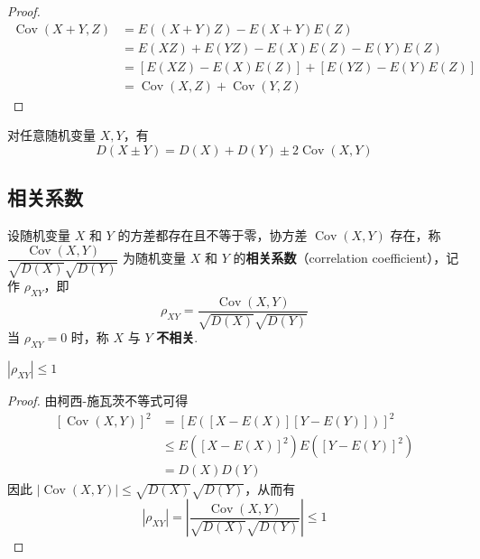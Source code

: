 \begin{proof}
    $$
    \begin{aligned}
        \operatorname{Cov}(X+Y,Z) &= E((X+Y)Z) - E(X+Y) E(Z) \\
        &= E(XZ) + E(YZ) - E(X) E(Z) - E(Y) E(Z) \\
        &= [E(XZ) - E(X) E(Z)] + [E(YZ) - E(Y) E(Z)] \\
        &= \operatorname{Cov}(X,Z) + \operatorname{Cov}(Y,Z)
    \end{aligned}
    $$
\end{proof}

\begin{property}
    对任意随机变量 $X,Y$，有
    $$
    D(X \pm Y) = D(X) + D(Y) \pm 2 \operatorname{Cov}(X,Y)
    $$
\end{property}

\subsection{相关系数}

\begin{definition}
    设随机变量 $X$ 和 $Y$ 的方差都存在且不等于零，协方差 $\operatorname{Cov}(X,Y)$ 存在，称 $\dfrac{\operatorname{Cov}(X,Y)}{\sqrt{D(X)} \sqrt{D(Y)}}$ 为随机变量 $X$ 和 $Y$ 的\textbf{相关系数}（correlation coefficient），记作 $\rho_{XY}$，即
    $$
    \rho_{XY} = \dfrac{\operatorname{Cov}(X,Y)}{\sqrt{D(X)} \sqrt{D(Y)}}
    $$
    当 $\rho_{XY} = 0$ 时，称 $X$ 与 $Y$ \textbf{不相关}.
\end{definition}

\begin{property}
    $|\rho_{XY}| \leqslant 1$
\end{property}

\vspace{-1.5em}

\begin{proof}
    由柯西-施瓦茨不等式可得
    $$
    \begin{aligned}
        \left[ \operatorname{Cov}(X,Y) \right]^2 &= [E([X-E(X)][Y-E(Y)])]^2 \\
        & \leqslant E([X-E(X)]^2) E([Y-E(Y)]^2) \\
        &= D(X) D(Y)
    \end{aligned}
    $$
    因此 $|\operatorname{Cov}(X,Y)| \leqslant \sqrt{D(X)} \sqrt{D(Y)}$，从而有
    $$
    |\rho_{XY}| = \left| \dfrac{\operatorname{Cov}(X,Y)}{\sqrt{D(X)} \sqrt{D(Y)}} \right| \leqslant 1
    $$

    \vspace{-2.3em}
\end{proof}

